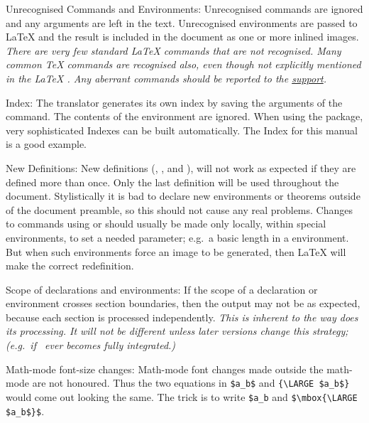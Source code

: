 \begin{htmllist}
\item [Unrecognised Commands and Environments:\index{unrecognised commands} ]
Unrecognised commands are ignored and any arguments are left in the text. 
Unrecognised environments are passed to \LaTeX{}  and the result is
included in the document as one or more inlined images.
\newline\textit
{There are very few standard \LaTeX{} commands that are not recognised.
Many common \TeX{} commands are recognised also,
even though not explicitly mentioned 
in the \LaTeX{} .
Any aberrant commands should be reported to the \latextohtml{}
\hyperref{mailing list}{mailing list, see Section~}{}{support}.}


\item [Index: ]
The translator generates its own index by saving the arguments  of 
the  command. The contents of the 
environment are ignored.
When using the  package,
very sophisticated Indexes can be built automatically.
The Index for this manual is a good example.


\item[New Definitions:\index{extensions!definitions} ]
New definitions (, , 
 and ),
will not work as expected if they are defined more than once.
Only the last definition will be used throughout the document.
Stylistically it is bad to declare new
environments or theorems outside of the document preamble,
so this should not cause any real problems.\html{\\}
Changes to commands using  or 
should usually be made only locally, within special environments,
to set a needed parameter; 
e.g.\ a basic length in a  environment.
But when such environments force an image to be generated,
then \LaTeX{} will make the correct redefinition.

\item [Scope of declarations and environments: ]
If the scope of a declaration or environment crosses section
boundaries, then the output may not be as expected, because each
section is processed independently.
\newline
\textit{This is inherent to the way \latextohtml{} does its processing. 
It will not be different unless later versions change this strategy;
(e.g.\ if \latextohtmlNG\ ever becomes fully integrated.)}

\item [Math-mode font-size changes: ]  Math-mode font changes
made outside the math-mode are not honoured.  Thus the two equations
in \verb|$a_b$| and \verb|{\LARGE $a_b$}|
would come out looking the same.  The trick is to write
\verb|$a_b| and \verb|$\mbox{\LARGE $a_b$}$|.
\end{htmllist}



